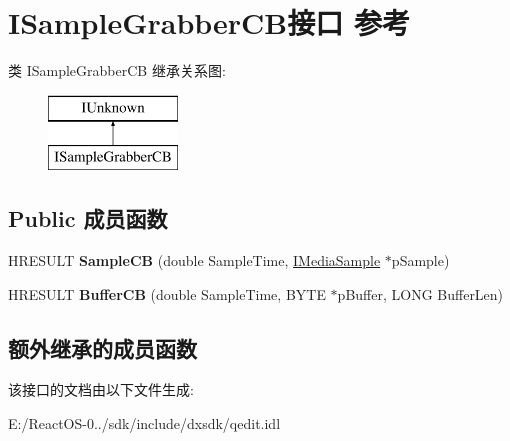 \hypertarget{interface_i_sample_grabber_c_b}{}\section{I\+Sample\+Grabber\+C\+B接口 参考}
\label{interface_i_sample_grabber_c_b}
类 I\+Sample\+Grabber\+CB 继承关系图\+:\begin{figure}[H]
\begin{center}
\leavevmode
\includegraphics[height=2.000000cm]{interface_i_sample_grabber_c_b}
\end{center}
\end{figure}
\subsection*{Public 成员函数}
\begin{DoxyCompactItemize}
\item 
\mbox{\label{interface_i_sample_grabber_c_b_a68d5714f78d8666c3c16ae7624732ea4}} 
H\+R\+E\+S\+U\+LT {\bfseries Sample\+CB} (double Sample\+Time, \hyperlink{interface_i_media_sample}{I\+Media\+Sample} $\ast$p\+Sample)
\item 
\mbox{\label{interface_i_sample_grabber_c_b_a8fd2b8034c6ce8079b3a24d2705faebc}} 
H\+R\+E\+S\+U\+LT {\bfseries Buffer\+CB} (double Sample\+Time, B\+Y\+TE $\ast$p\+Buffer, L\+O\+NG Buffer\+Len)
\end{DoxyCompactItemize}
\subsection*{额外继承的成员函数}


该接口的文档由以下文件生成\+:\begin{DoxyCompactItemize}
\item 
E\+:/\+React\+O\+S-\/0../sdk/include/dxsdk/qedit.\+idl\end{DoxyCompactItemize}
